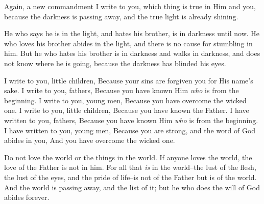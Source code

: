 \bverse Again, a new commandment I write to you, which thing is true in Him and you, because the darkness is passing away, and the true light is already shining.

\bverse He who says he is in the light, and hates his brother, is in darkness until now.
\bverse He who loves his brother abides in the light, and there is no cause for stumbling in him.
\bverse But he who hates his brother is in darkness and walks in darkness, and does not know where he is going, because the darkness has blinded his eyes.


\begin{bquotation}
\bverse I write to you, little children, Because your sins are forgiven you for His name's sake.
\bverse I write to you, fathers, Because you have known Him \textit{who} is from the beginning. I write to you, young men, Because you have overcome the wicked one. I write to you, little children, Because you have known the Father.
\bverse I have written to you, fathers, Because you have known Him \textit{who} is from the beginning. I have written to you, young men, Because you are strong, and the word of God abides in you, And you have overcome the wicked one.
\end{bquotation}


\bverse Do not love the world or the things in the world. If anyone loves the world, the love of the Father is not in him.
\bverse For all that \textit{is} in the world--the lust of the flesh, the lust of the eyes, and the pride of life--is not of the Father but is of the world.
\bverse  And the world is passing away, and the list of it; but he who does the will of God abides forever.


